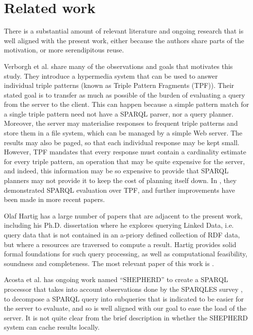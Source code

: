 \section{Related work}\label{sec:related}

There is a substantial amount of relevant literature and ongoing
research that is well aligned with the present work, either because
the authors share parts of the motivation, or more serendipitous
reuse.

Verborgh et al. \cite{ldf1} share many of the observations and goals
that motivates this study. They introduce a hypermedia system that can
be used to answer individual triple patterns (known as Triple Pattern
Fragments (TPF)). Their stated goal is to transfer as much as possible
of the burden of evaluating a query from the server to the
client. This can happen because a simple pattern match for a single
triple pattern need not have a SPARQL parser, nor a query
planner. Moreover, the server may materialise responses to frequent
triple patterns and store them in a file system, which can be managed
by a simple Web server. The results may also be paged, so that each
individual response may be kept small. However, TPF mandates that
every response must contain a cardinality estimate for every triple
pattern, an operation that may be quite expensive for the server, and
indeed, this information may be so expensive to provide that SPARQL
planners may not provide it to keep the cost of planning itself
down. In \cite{TODO}, they demonstrated SPARQL evaluation over TPF,
and further improvements have been made in more recent papers.

Olaf Hartig has a large number of papers that are adjacent to the
present work, including his Ph.D. dissertation \cite{TODO} where he
explores querying Linked Data, i.e. query data that is not contained
in an a-priory defined collection of RDF data, but where a resources
are traversed to compute a result. Hartig provides solid formal
foundations for such query processing, as well as computational
feasibility, soundness and completeness. The most relevant paper of
this work is \cite{TODO}.

Acosta et al. \cite{TODO} has ongoing work named ``SHEPHERD'' to
create a SPARQL processor that takes into account observations done by
the SPARQLES survey \cite{TODO}, to decompose a SPARQL query into
subqueries that is indicated to be easier for the server to evaluate,
and so is well aligned with our goal to ease the load of the
server. It is not quite clear from the brief description in 
\cite{TODO} whether the SHEPHERD system can cache results locally.

